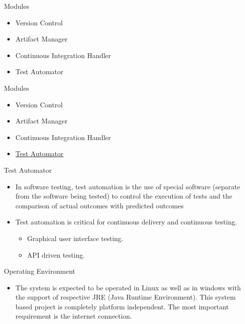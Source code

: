 \documentclass{beamer}
\begin{document}
\begin{frame}{Modules}
\begin{itemize}
\item Version Control
\item Artifact Manager
\item Continuous Integration Handler
\item Test Automator

\end{itemize}

\end{frame}

\begin{frame}{Modules}
\begin{itemize}
\item Version Control
\item Artifact Manager
\item Continuous Integration Handler
\item \underline{Test Automator}

\end{itemize}

\end{frame}

\begin{frame}{Test Automator}
\begin{itemize}
\item  In software testing, test automation is the use of special software (separate from the
software being tested) to control the execution of tests and the comparison of actual outcomes with predicted outcomes
\vspace{0.5 cm}
\item Test automation is critical for continuous
delivery and continuous testing.
\vspace{0.5 cm}
\begin{itemize}
\item  Graphical user interface testing.
\item API driven testing.
\end{itemize}
\end{itemize}
\end{frame}

\begin{frame}{Operating Environment}
\begin{itemize}
\item The system is expected to be operated in Linux as well as in windows with the support of
respective JRE (Java Runtime Environment). This system based project is completely platform
independent. The most important requirement is the internet connection.
\end{itemize}
\end{frame}
\end{document}
